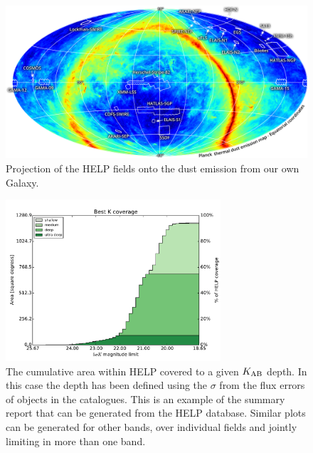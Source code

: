\documentclass[usenatbib]{mnras}
\begin{document}
\begin{figure}
  \centering \includegraphics[width=16cm]{figs/HELP-fields.png}
  \caption[HELP Sky]{Projection of the HELP fields onto the dust emission from
    our own Galaxy.}\label{fig:helpsky}
\end{figure}

\begin{figure}
  \includegraphics[width=8cm]{figs/K_coverage_v1_2_full.pdf}
  \caption[K-band coverage]{The cumulative area within HELP covered to a given
    $K_{\rm AB}$ depth. In this case the depth has been defined using the
    $\sigma$ from the flux errors of objects in the catalogues. This is an example
    of the summary report that can be generated from the HELP database. Similar
    plots can be generated for other bands, over individual fields and jointly
    limiting in more than one band. }\label{fig:k}
\end{figure}
\end{document}
